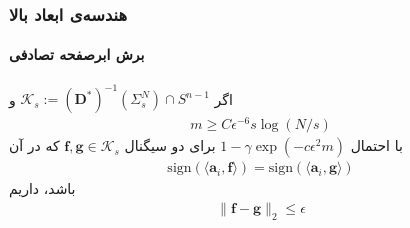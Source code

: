 \begin{frame}
\frametitle{هندسه‌ی ابعاد بالا}
\framesubtitle{برش ابرصفحه تصادفی}
\begin{small}
\begin{theorem}
اگر
$ \mathcal{K}_{s}:= \left(\mathbf{D}^{\ast}\right)^{-1}\left(\Sigma_{s}^{N}\right)\cap S^{n-1} $
و
\begin{align*}
	m \geq C \epsilon^{-6} s \log\left(N/s\right)
\end{align*}
با احتمال
$1-\gamma\exp(-c\epsilon^{2}m)$
برای دو سیگنال 
$\bm{f},\bm{g}\in \mathcal{K}_{s}$
که در آن
\begin{align}
\text{sign}(\langle \bm{a}_i,\bm{f}\rangle)=\text{sign}(\langle \bm{a}_i,\bm{g}\rangle)
\end{align}
باشد، داریم
\begin{align}
\|\bm{f}-\bm{g}\|_{2}\leq \epsilon
\end{align}
\end{theorem}
\end{small}
\cite{Baraniuk2017}
\end{frame}
